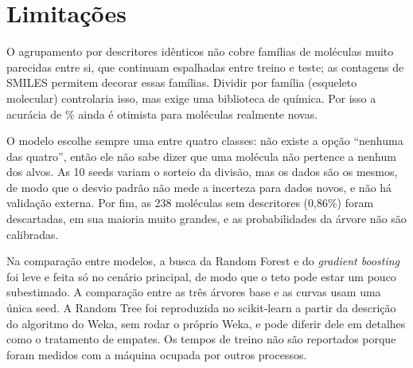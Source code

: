 \section{Limitações}\label{sec:limitacoes}

O agrupamento por descritores idênticos não cobre famílias de moléculas muito parecidas entre si, que continuam espalhadas entre treino e teste; as contagens de SMILES permitem decorar essas famílias. Dividir por família (esqueleto molecular) controlaria isso, mas exige uma biblioteca de química. Por isso a acurácia de \accGrupAmbos\% ainda é otimista para moléculas realmente novas.

O modelo escolhe sempre uma entre quatro classes: não existe a opção ``nenhuma das quatro'', então ele não sabe dizer que uma molécula não pertence a nenhum dos alvos. As 10 seeds variam o sorteio da divisão, mas os dados são os mesmos, de modo que o desvio padrão não mede a incerteza para dados novos, e não há validação externa. Por fim, as 238 moléculas sem descritores (0,86\%) foram descartadas, em sua maioria muito grandes, e as probabilidades da árvore não são calibradas.

Na comparação entre modelos, a busca da Random Forest e do \emph{gradient boosting} foi leve e feita só no cenário principal, de modo que o teto pode estar um pouco subestimado. A comparação entre as três árvores base e as curvas usam uma única seed. A Random Tree foi reproduzida no scikit-learn a partir da descrição do algoritmo do Weka, sem rodar o próprio Weka, e pode diferir dele em detalhes como o tratamento de empates. Os tempos de treino não são reportados porque foram medidos com a máquina ocupada por outros processos.
